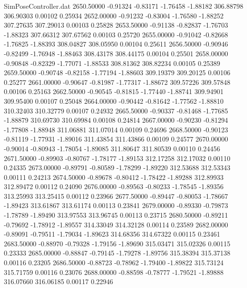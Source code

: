 \begin{filecontents}{SimPoseController.dat}
2650.50000   -0.91324   -0.83171    -1.76458   -1.88182  306.88798  306.90303    0.00102    0.25934
2652.00000   -0.91232   -0.83004    -1.76580   -1.88252  307.27635  307.29013    0.00103    0.25828
2653.50000   -0.91138   -0.82837    -1.76703   -1.88323  307.66312  307.67562    0.00103    0.25720
2655.00000   -0.91042   -0.82668    -1.76825   -1.88393  308.04827  308.05950    0.00104    0.25611
2656.50000   -0.90946   -0.82499    -1.76948   -1.88463  308.43178  308.44175    0.00104    0.25501
2658.00000   -0.90848   -0.82329    -1.77071   -1.88533  308.81362  308.82234    0.00105    0.25389
2659.50000   -0.90748   -0.82158    -1.77194   -1.88603  309.19379  309.20125    0.00106    0.25277
2661.00000   -0.90647   -0.81987    -1.77317   -1.88672  309.57226  309.57848    0.00106    0.25163
2662.50000   -0.90545   -0.81815    -1.77440   -1.88741  309.94901  309.95400    0.00107    0.25048
2664.00000   -0.90442   -0.81642    -1.77562   -1.88810  310.32403  310.32779    0.00107    0.24932
2665.50000   -0.90337   -0.81468    -1.77685   -1.88879  310.69730  310.69984    0.00108    0.24814
2667.00000   -0.90230   -0.81294    -1.77808   -1.88948  311.06881  311.07014    0.00109    0.24696
2668.50000   -0.90123   -0.81119    -1.77931   -1.89016  311.43854  311.43866    0.00109    0.24577
2670.00000   -0.90014   -0.80943    -1.78054   -1.89085  311.80647  311.80539    0.00110    0.24456
2671.50000   -0.89903   -0.80767    -1.78177   -1.89153  312.17258  312.17032    0.00110    0.24335
2673.00000   -0.89791   -0.80589    -1.78299   -1.89220  312.53688  312.53343    0.00111    0.24213
2674.50000   -0.89678   -0.80412    -1.78422   -1.89288  312.89933  312.89472    0.00112    0.24090
2676.00000   -0.89563   -0.80233    -1.78545   -1.89356  313.25993  313.25415    0.00112    0.23966
2677.50000   -0.89447   -0.80053    -1.78667   -1.89423  313.61867  313.61174    0.00113    0.23841
2679.00000   -0.89330   -0.79873    -1.78789   -1.89490  313.97553  313.96745    0.00113    0.23715
2680.50000   -0.89211   -0.79692    -1.78912   -1.89557  314.33049  314.32128    0.00114    0.23589
2682.00000   -0.89091   -0.79511    -1.79034   -1.89623  314.68356  314.67322    0.00115    0.23461
2683.50000   -0.88970   -0.79328    -1.79156   -1.89690  315.03471  315.02326    0.00115    0.23333
2685.00000   -0.88847   -0.79145    -1.79278   -1.89756  315.38394  315.37138    0.00116    0.23205
2686.50000   -0.88723   -0.78962    -1.79400   -1.89822  315.73124  315.71759    0.00116    0.23076
2688.00000   -0.88598   -0.78777    -1.79521   -1.89888  316.07660  316.06185    0.00117    0.22946

\end{filecontents}
